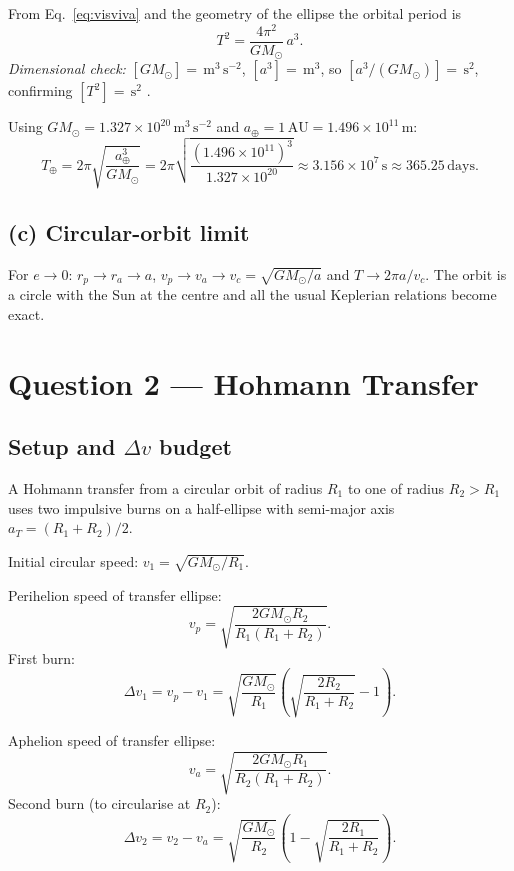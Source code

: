 \documentclass[11pt, a4paper]{article}
\newcommand{\unit}[1]{\,\mathrm{#1}}
\begin{document}
From Eq.~\eqref{eq:visviva} and the geometry of the ellipse the orbital period is
\begin{equation}
  \boxed{T^2 = \frac{4\pi^2}{GM_\odot}\,a^3.}
  \label{eq:k3}
\end{equation}
\textit{Dimensional check:}
$[GM_\odot] = \unit{m^3\,s^{-2}}$, $[a^3] = \unit{m^3}$, so
$[a^3/(GM_\odot)] = \unit{s^2}$, confirming $[T^2] = \unit{s^2}$ \checkmark.

Using $GM_\odot = 1.327 \times 10^{20}\unit{m^3\,s^{-2}}$ and $a_\oplus = 1\unit{AU}
= 1.496 \times 10^{11}\unit{m}$:
\[
  T_\oplus = 2\pi\sqrt{\frac{a_\oplus^3}{GM_\odot}}
           = 2\pi\sqrt{\frac{(1.496\times10^{11})^3}{1.327\times10^{20}}}
           \approx 3.156\times10^7\unit{s} \approx 365.25\unit{days.}
\]

\subsection*{(c) Circular-orbit limit}

For $e \to 0$: $r_p \to r_a \to a$, $v_p \to v_a \to v_c = \sqrt{GM_\odot/a}$
and $T \to 2\pi a/v_c$.  The orbit is a circle with the Sun at the centre and
all the usual Keplerian relations become exact.

\section{Question 2 — Hohmann Transfer}

\subsection*{Setup and $\Delta v$ budget}

A Hohmann transfer from a circular orbit of radius $R_1$ to one of radius $R_2 > R_1$
uses two impulsive burns on a half-ellipse with semi-major axis $a_T = (R_1+R_2)/2$.

Initial circular speed: $v_1 = \sqrt{GM_\odot/R_1}$.

Perihelion speed of transfer ellipse:
\[
  v_p = \sqrt{\frac{2GM_\odot R_2}{R_1(R_1+R_2)}}.
\]
First burn:
\begin{equation}
  \Delta v_1 = v_p - v_1 = \sqrt{\frac{GM_\odot}{R_1}}\!\left(\sqrt{\frac{2R_2}{R_1+R_2}}-1\right).
\end{equation}

Aphelion speed of transfer ellipse:
\[
  v_a = \sqrt{\frac{2GM_\odot R_1}{R_2(R_1+R_2)}}.
\]
Second burn (to circularise at $R_2$):
\begin{equation}
  \Delta v_2 = v_2 - v_a = \sqrt{\frac{GM_\odot}{R_2}}\!\left(1-\sqrt{\frac{2R_1}{R_1+R_2}}\right).
\end{equation}
\end{document}

